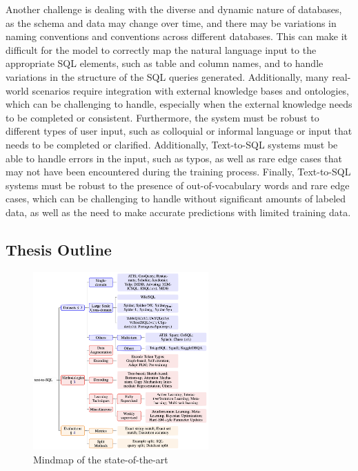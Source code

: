 Another challenge is dealing with the diverse and dynamic nature of databases, as the schema and data may change over time, and there may be variations in naming conventions and conventions across different databases. This can make it difficult for the model to correctly map the natural language input to the appropriate SQL elements, such as table and column names, and to handle variations in the structure of the SQL queries generated. Additionally, many real-world scenarios require integration with external knowledge bases and ontologies, which can be challenging to handle, especially when the external knowledge needs to be completed or consistent. Furthermore, the system must be robust to different types of user input, such as colloquial or informal language or input that needs to be completed or clarified. Additionally, Text-to-SQL systems must be able to handle errors in the input, such as typos, as well as rare edge cases that may not have been encountered during the training process. Finally, Text-to-SQL systems must be robust to the presence of out-of-vocabulary words and rare edge cases, which can be challenging to handle without significant amounts of labeled data, as well as the need to make accurate predictions with limited training data.

\clearpage
\subsection{Thesis Outline}
\begin{figure}[htb]
      \centering
      \includegraphics[width=0.6\textwidth]{pics/mindmap.png}
      \caption{Mindmap of the state-of-the-art}
      \label{fig:mindmap}
\end{figure}

